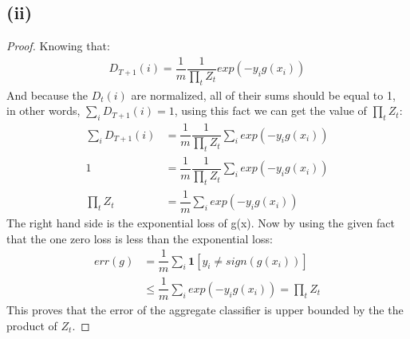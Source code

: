 \documentclass[]{homework}
\begin{document}
\subsection*{(ii)}
\begin{proof}
Knowing that:
\begin{align*}
    D_{T+1}(i)= \dfrac{1}{m}\dfrac{1}{\prod_t Z_t}exp(-y_ig(x_i))
\end{align*}
And because the $D_t(i)$ are normalized, all of their sums should be equal to 1, in other words, $\sum_i D_{T+1}(i) = 1$, using this fact we can get the value of $\prod_t Z_t$:
\begin{align*}
    \sum_i D_{T+1}(i) &= \dfrac{1}{m}\dfrac{1}{\prod_t Z_t} \sum_i exp(-y_ig(x_i)) \\
    1 &= \dfrac{1}{m}\dfrac{1}{\prod_t Z_t} \sum_i exp(-y_ig(x_i))\\
    \prod_t Z_t &= \dfrac{1}{m} \sum_i exp(-y_ig(x_i))
\end{align*}
The right hand side is the exponential loss of g(x). Now by using the given fact that the one zero loss is less than the exponential loss:
\begin{align*}
    err(g) &= \dfrac{1}{m} \sum_i \mathbf{1}[y_i \neq sign(g(x_i))]\\
    &\leq \dfrac{1}{m} \sum_i exp(-y_ig(x_i))
    = \prod_t Z_t
\end{align*}
This proves that the error of the aggregate classifier is upper bounded by the the product of $Z_t$.
\end{proof}
\end{document}

